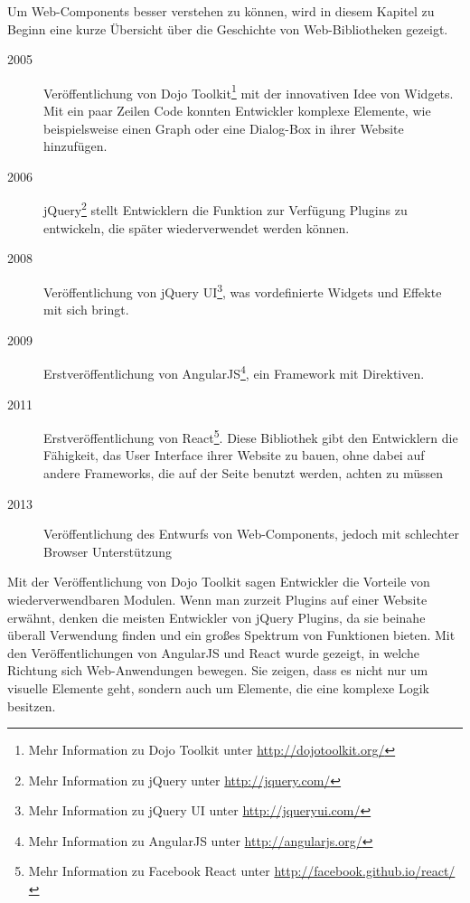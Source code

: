 
Um Web-Components besser verstehen zu können, wird in diesem Kapitel zu Beginn eine kurze Übersicht über die Geschichte von Web-Bibliotheken gezeigt.

\begin{description}
\item[2005] Veröffentlichung von Dojo Toolkit\footnote{Mehr Information zu Dojo Toolkit unter \href{http://dojotoolkit.org/}{http://dojotoolkit.org/}} mit der innovativen Idee von Widgets. Mit ein paar Zeilen Code konnten Entwickler komplexe Elemente, wie beispielsweise einen Graph oder eine Dialog-Box in ihrer Website hinzufügen.
\item[2006] jQuery\footnote{Mehr Information zu jQuery unter \href{http://jquery.com/}{http://jquery.com/}} stellt Entwicklern die Funktion zur Verfügung Plugins zu entwickeln, die später wiederverwendet werden können.
\item[2008] Veröffentlichung von jQuery UI\footnote{Mehr Information zu jQuery UI unter \href{http://jqueryui.com/}{http://jqueryui.com/}}, was vordefinierte Widgets und Effekte mit sich bringt.
\item[2009] Erstveröffentlichung von AngularJS\footnote{Mehr Information zu AngularJS unter \href{http://angularjs.org/}{http://angularjs.org/}}, ein Framework mit Direktiven.
\item[2011] Erstveröffentlichung von React\footnote{Mehr Information zu Facebook React unter \href{http://facebook.github.io/react/}{http://facebook.github.io/react/}}. Diese Bibliothek gibt den Entwicklern die Fähigkeit, das User Interface ihrer Website zu bauen, ohne dabei auf andere Frameworks, die auf der Seite benutzt werden, achten zu müssen
\item[2013] Veröffentlichung des Entwurfs von Web-Components, jedoch mit schlechter Browser Unterstützung
\end{description}

Mit der Veröffentlichung von Dojo Toolkit sagen Entwickler die Vorteile von wiederverwendbaren Modulen. Wenn man zurzeit Plugins auf einer Website erwähnt, denken die meisten Entwickler von jQuery Plugins, da sie beinahe überall Verwendung finden und ein großes Spektrum von Funktionen bieten. Mit den Veröffentlichungen von AngularJS und React wurde gezeigt, in welche Richtung sich Web-Anwendungen bewegen. Sie zeigen, dass es nicht nur um visuelle Elemente geht, sondern auch um Elemente, die eine komplexe Logik besitzen.




